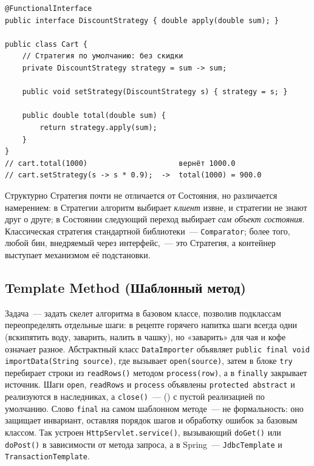 \begin{listing}[H]
\begin{verbatim}
@FunctionalInterface
public interface DiscountStrategy { double apply(double sum); }

public class Cart {
    // Стратегия по умолчанию: без скидки
    private DiscountStrategy strategy = sum -> sum;

    public void setStrategy(DiscountStrategy s) { strategy = s; }

    public double total(double sum) {
        return strategy.apply(sum);
    }
}
// cart.total(1000)                     вернёт 1000.0
// cart.setStrategy(s -> s * 0.9);  ->  total(1000) = 900.0
\end{verbatim}
\caption{Стратегия расчёта скидки}
\label{lst:11-10}
\end{listing}

Структурно Стратегия почти не отличается от Состояния, но различается намерением:
в Стратегии алгоритм выбирает \emph{клиент} извне, и стратегии не знают друг о
друге; в Состоянии следующий переход выбирает \emph{сам объект состояния}.
Классическая стратегия стандартной библиотеки~--- \texttt{Comparator}; более
того, любой бин, внедряемый через интерфейс,~--- это Стратегия, а контейнер
выступает механизмом её подстановки.

\subsection{Template Method (Шаблонный метод)}

Задача~--- задать скелет алгоритма в базовом классе, позволив подклассам
переопределять отдельные шаги: в рецепте горячего напитка шаги всегда одни
(вскипятить воду, заварить, налить в чашку), но «заварить» для чая и кофе
означает разное. Абстрактный класс \texttt{DataImporter} объявляет
\texttt{public final void importData(String source)}, где вызывает
\texttt{open(source)}, затем в блоке \texttt{try} перебирает строки из
\texttt{readRows()} методом \texttt{process(row)}, а в \texttt{finally}
закрывает источник. Шаги \texttt{open}, \texttt{readRows} и \texttt{process}
объявлены \texttt{protected abstract} и реализуются в наследниках, а
\texttt{close()}~---  () с пустой реализацией по умолчанию.
Слово \texttt{final} на самом шаблонном методе~--- не формальность: оно защищает
инвариант, оставляя порядок шагов и обработку ошибок за базовым классом. Так
устроен \texttt{HttpServlet.service()}, вызывающий \texttt{doGet()} или
\texttt{doPost()} в зависимости от метода запроса, а в Spring~---
\texttt{JdbcTemplate} и \texttt{TransactionTemplate}.

